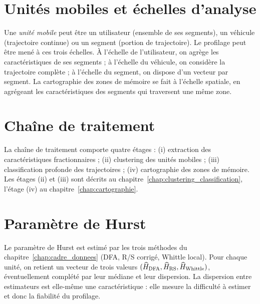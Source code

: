 \section{Unités mobiles et échelles d'analyse}
Une \emph{unité mobile} peut être un utilisateur (ensemble de ses segments), un véhicule (trajectoire continue) ou un segment (portion de trajectoire). Le profilage peut être mené à ces trois échelles. À l'échelle de l'utilisateur, on agrège les caractéristiques de ses segments ; à l'échelle du véhicule, on considère la trajectoire complète ; à l'échelle du segment, on dispose d'un vecteur par segment. La cartographie des zones de mémoire se fait à l'échelle spatiale, en agrégeant les caractéristiques des segments qui traversent une même zone.

\section{Chaîne de traitement}
La chaîne de traitement comporte quatre étages : (i) extraction des caractéristiques fractionnaires ; (ii) clustering des unités mobiles ; (iii) classification profonde des trajectoires ; (iv) cartographie des zones de mémoire. Les étages (ii) et (iii) sont décrits au chapitre~\ref{chap:clustering_classification}, l'étage (iv) au chapitre~\ref{chap:cartographie}.

\section{Paramètre de Hurst \Hurst}
Le paramètre de Hurst est estimé par les trois méthodes du chapitre~\ref{chap:cadre_donnees} (DFA, R/S corrigé, Whittle local). Pour chaque unité, on retient un vecteur de trois valeurs $(\widehat{H}_{\text{DFA}}, \widehat{H}_{\text{RS}}, \widehat{H}_{\text{Whittle}})$, éventuellement complété par leur médiane et leur dispersion. La dispersion entre estimateurs est elle-même une caractéristique : elle mesure la difficulté à estimer \Hurst{} et donc la fiabilité du profilage.

